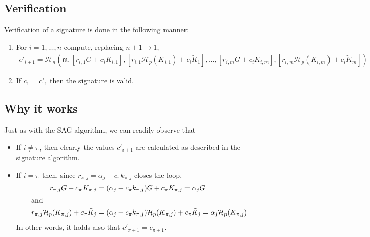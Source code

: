 

\subsection*{Verification}

Verification of a signature is done in the following manner:

\begin{enumerate}
	\item For \(i = 1, ..., n\) compute, replacing \(n + 1 \rightarrow 1\),\vspace{.175cm}
	\begin{align*}
	c'_{i+1} = \mathcal{H}_n(\mathfrak{m}, [r_{i, 1} G + c_i K_{i, 1}], [r_{i, 1} \mathcal{H}_p(K_{i, 1}) + c_i \tilde{K}_1], 
	..., [r_{i, m} G + c_i K_{i, m}], [r_{i, m} \mathcal{H}_p(K_{i, m}) + c_i \tilde{K}_m])
	\end{align*}

	\item If \(c_1 = c'_1\) then the signature is valid.
\end{enumerate}


\subsection*{Why it works}

Just as with the SAG algorithm, we can readily observe that

\begin{itemize}
    \item If \(i \ne \pi \), then clearly the values \(c'_{i + 1}\) are calculated as described in the signature algorithm.

    \item If \(i = \pi\) then, since \(r_{\pi, j} = \alpha_j - c_\pi k_{\pi, j} \) closes the loop,\vspace{.175cm}
    \begin{alignat*}{6}
        r_{\pi, j} G + c_\pi K_{\pi,j} &= (\alpha_j - c_\pi k_{\pi, j}) G + c_\pi K_{\pi,j} = \alpha_j G\\
        \intertext{and}
        r_{\pi, j} \mathcal{H}_p(K_{\pi, j}) + c_\pi \tilde{K}_j &= (\alpha_j - c_\pi k_{\pi, j}) \mathcal{H}_p(K_{\pi, j}) + c_\pi \tilde{K}_j = \alpha_j \mathcal{H}_p(K_{\pi, j})\\
    \end{alignat*}
    In other words, it holds also that \(c'_{\pi + 1} = c_{\pi+1}\).
\end{itemize}


